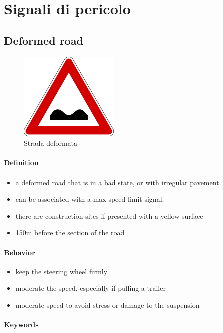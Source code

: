 
\section*{Signali di pericolo}
\label{chap:07}

\subsection*{Deformed road}
\begin{figure}[h]
  \includegraphics[width=0.3\linewidth]{images/strada_deformata.png}
  \caption{Strada deformata}
\end{figure}

\paragraph{Definition}
\begin{itemize}
\item a deformed road that is in a bad state, or with irregular pavement
\item can be associated with a max speed limit signal.
\item there are construction sites if presented with a yellow surface
\item 150m before the section of the road
\end{itemize}

\paragraph{Behavior}
\begin{itemize}
\item keep the steering wheel firmly
\item moderate the speed, especially if pulling a trailer
\item moderate speed to avoid stress or damage to the suspension
\end{itemize}

\paragraph{Keywords}

